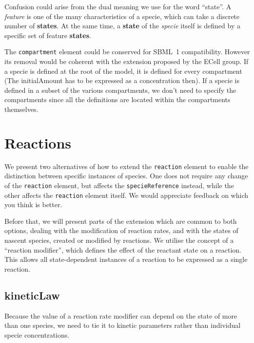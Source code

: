 \documentclass{cekarticle}
\begin{document}
Confusion could arise from the dual meaning we use for the word ``state''. A
\emph{feature} is one of the many characteristics of a specie, which can take a
discrete number of \textbf{states}. At the same time, a \textbf{state} of the
\emph{specie} itself is defined by a specific set of feature \textbf{states}.

The \texttt{compartment} element could be conserved for SBML~1 compatibility.
However its removal would be coherent with the extension proposed by the ECell
group.  If a specie is defined at the root of the model, it is defined for every
compartment (The initialAmount has to be expressed as a concentration then).
If a specie is defined in a subset of the various compartments, we don't need to
specify the compartments since all the definitions are located within the
compartments themselves.

\section{Reactions}
\label{sec:reactions}

We present two alternatives of how to extend the \texttt{reaction} element to
enable the distinction between specific instances of species.  One does not
require any change of the \texttt{reaction} element, but affects the
\texttt{specieReference} instead, while the other affects
the \texttt{reaction} element itself.  We would appreciate feedback on which
you think is better.

Before that, we will present parts of the extension which are common to both
options, dealing with the modification of reaction rates, and with the states
of nascent species, created or modified by reactions. We utilise the concept of
a ``reaction modifier'', which defines the effect of the reactant state on a
reaction.  This allows all state-dependent instances of a reaction to be
expressed as a single reaction.


\subsection{kineticLaw}\label{sec:kineticLaw}

Because the value of a reaction rate modifier can depend on the
state of more than one species, we need to tie it to kinetic
parameters rather than individual specie concentrations.  
\end{document}
